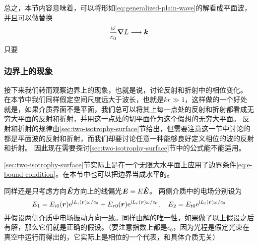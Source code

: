 \documentclass[UTF8, a4paper]{ctexart}
\newcommand*{\ii}{\mathrm{i}}
\newcommand*{\ee}{\mathrm{e}}
\begin{document}
总之，本节内容意味着，可以将形如\eqref{eq:generalized-plain-wave}的解看成平面波，并且可以做替换
\begin{equation}
    \frac{\omega}{c_0} \grad{L} \longrightarrow \vb*{k}
    \label{eq:generalized-k}
\end{equation}
只要

\subsubsection{边界上的现象}

接下来我们转而观察边界上的现象，也就是说，讨论反射和折射中的相位变化。
在本节中我们同样假定空间尺度远大于波长，也就是$kr \gg 1$，这样做的一个好处就是，如果介质界面不是平面，我们总可以将其上每一点处的反射和折射都看成无穷大平面的反射和折射，并用这一点处的切平面作为这个假想的无穷大平面。
反射和折射的规律由\ref{sec:two-isotrophy-surface}节给出，但需要注意这一节中讨论的都是平面波的反射和折射，而我们却要讨论任意一种能够良好定义相位的波的反射和折射。
因此现在需要探讨\ref{sec:two-isotrophy-surface}节中的公式能不能适用。

\ref{sec:two-isotrophy-surface}节实际上是在一个无限大水平面上应用了边界条件\eqref{eq:e-bound-condition}。在本节中也可以把边界当成水平的。

同样还是只考虑方向$\vu*{E}$方向上的线偏光$\vb*{E} = E \vu*{E}$。
两侧介质中的电场分别设为
\[
    E_1 = E_{i0}(\vb*{r}) \ee^{\ii L_i(\vb*{r}) \omega / c_0} + E_{r0}(\vb*{r}) \ee^{\ii L_r(\vb*{r}) \omega / c_0}, \quad E_2 = E_{t0} \ee^{\ii L_t(\vb*{r}) \omega / c_0}
\]
并假设两侧介质中电场振动方向一致。同样由解的唯一性，如果做了以上假设之后有解，那么它们就是正确的假设。（要注意指数上都是$c_0$，因为光程是假定光束在真空中运行而得出的，它实际上是相位的一个代表，和具体介质无关）
\end{document}
